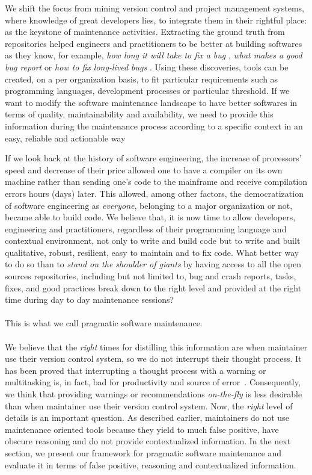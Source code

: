 We shift the focus from mining version control and project management systems, where knowledge of great developers lies, to integrate them in their rightful place: as the keystone of maintenance activities.
Extracting the ground truth from repositories helped engineers and practitioners to be better at building softwares as they know, for example, {\it how long it will take to fix a bug} \cite{Weiss2007}, {\it what makes a good bug report} \cite{Bettenburg2008} or {\it how to fix long-lived bugs} \cite{Saha2014}.
Using these discoveries, tools can be created, on a per organization basis, to fit particular requirements such as programming languages, development processes or particular threshold. If we want to modify the software maintenance landscape to have better softwares in terms of quality, maintainability and availability, we need to provide this information during the maintenance process according to a specific context in an easy, reliable and  actionable way

If we look back at the history of software engineering, the increase of processors' speed and decrease of their price allowed one to have a compiler on its own machine rather than sending one's code to the mainframe and receive compilation errors hours (days) later. This allowed, among other factors, the democratization of software engineering as {\it everyone}, belonging to a major organization or not, became able to build code. We believe that, it is now time to allow developers, engineering and practitioners, regardless of their programming language and contextual environment, not only to write and build code but to write and built qualitative, robust, resilient, easy to maintain and to fix code. What better way to do so than to {\it stand on the shoulder of giants} by having access to all the open sources repositories, including but not limited to, bug and crash reports, tasks, fixes, and good practices break down to the right level and provided at the right time during day to day maintenance sessions?
\\ \\
This is what we call pragmatic software maintenance.
\\ \\
We believe that the {\it right} times for distilling this information are when maintainer use their version control system, so we do not interrupt their thought process.
It has been proved that interrupting a thought process with a warning or multitasking is, in fact, bad for productivity and source of error~\cite{Trafton2003,Altmann2004,LOHR,hunt2008pragmatic,gobbo2008pomodoro}.
Consequently, we think that providing warnings or recommendations {\it on-the-fly} is less desirable than when maintainer use their version control system.
Now, the {\it right} level of details is an important question.
As described earlier, maintainers do not use maintenance oriented tools because they yield to much false positive, have obscure reasoning and do not provide contextualized information\cite{Hovemeyer2004, Lopez2011, Johnson2013, Lewis2013}.
In the next section, we present our framework for pragmatic software maintenance and evaluate it in terms of false positive, reasoning and contextualized information.


